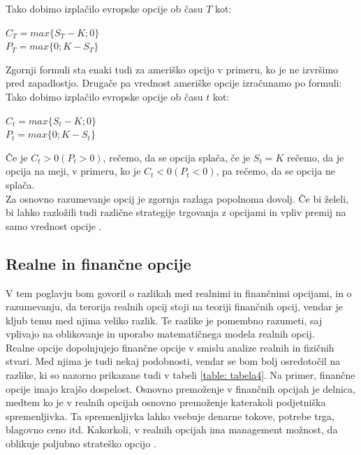 \documentclass[12pt, a4paper]{amsart}
\theoremstyle{definition} %
\theoremstyle{plain} %
\begin{document}
Tako dobimo izplačilo evropske opcije ob času $T$ kot:
\begin{center}
$C_T = max\{S_T - K; 0\}$\\
$P_T = max\{0; K - S_T\}$
\end{center}  
Zgornji formuli sta enaki tudi za ameriško opcijo v primeru, ko je ne izvršimo pred zapadlostjo. Drugače pa vrednost ameriške opcije izračunamo po formuli:\\
Tako dobimo izplačilo evropske opcije ob času $t$ kot:
\begin{center}
$C_t = max\{S_t - K; 0\}$\\
$P_t = max\{0; K - S_t\}$
\end{center}  
Če je $C_t>0 (P_t>0)$, rečemo, da se opcija splača, če je $S_t=K$ rečemo, da je opcija na meji, v primeru, ko je $C_t<0 (P_t<0)$, pa rečemo, da se opcija ne splača.\\
Za osnovno razumevanje opcij je zgornja razlaga popolnoma dovolj. Če bi želeli, bi lahko razložili tudi različne strategije trgovanja z opcijami in vpliv premij na samo vrednost opcije \cite[str. 54-58]{Kosir}.

\subsection{Realne in finančne opcije}
V tem poglavju bom govoril o razlikah med realnimi in finančnimi opcijami, in o razumevanju, da terorija realnih opcij stoji na teoriji finančnih opcij, vendar je kljub temu med njima veliko razlik. Te razlike je pomembno razumeti, saj vplivajo na oblikovanje in uporabo matematičnega modela realnih opcij. \\

Realne opcije dopolnjujejo finančne opcije v smislu analize realnih in fizičnih stvari. Med njima je tudi nekaj podobnosti, vendar se bom bolj osredotočil na razlike, ki so nazorno prikazane tudi v tabeli \ref{table: tabela4}. Na primer, finančne opcije imajo krajšo dospelost. Osnovno premoženje v finančnih opcijah je delnica, medtem ko je v realnih opcijah osnovno premoženje katerakoli podjetniška spremenljivka. Ta spremenljivka lahko vsebuje denarne tokove, potrebe trga, blagovno ceno itd. Kakorkoli, v realnih opcijah ima management možnost, da oblikuje poljubno strateško opcijo \cite[str. 109, 110]{Mun}.
\pagebreak
\end{document}
